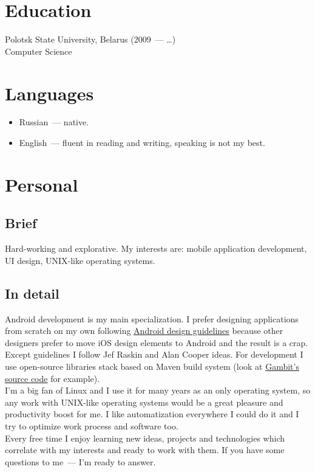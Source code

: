   \section*{Education}

    Polotsk State University, Belarus (2009~--- \dots) \\
    Computer Science

  \section*{Languages}

    \begin{itemize}

      \item Russian~--- native.

      \item English~--- fluent in reading and writing, speaking is not my best.

    \end{itemize}

  \section*{Personal}

    \subsection*{Brief}

      Hard-working and explorative. My interests are:
      mobile application development, UI design, UNIX-like
      operating systems.

    \subsection*{In detail}

      Android development is my main specialization. I prefer designing
      applications from scratch on my own following
      \href{https://developer.android.com/design/}{Android design guidelines}
      because other designers prefer to move iOS design elements to Android
      and the result is a crap. Except guidelines I follow Jef Raskin
      and Alan Cooper ideas. For development I use open-source libraries
      stack based on Maven build system (look at
      \href{https://github.com/ming13/gambit}{Gambit’s source code} for example). \\

      I’m a big fan of Linux and I use it for many years as
      an only operating system, so any work with UNIX-like operating systems
      would be a great pleasure and productivity boost for me.
      I like automatization everywhere I could do it and I try to optimize
      work process and software too. \\

      Every free time I enjoy learning new ideas, projects and technologies
      which correlate with my interests and ready to work with them.
      If you have some questions to me~--- I’m ready to answer.

  \vfill


